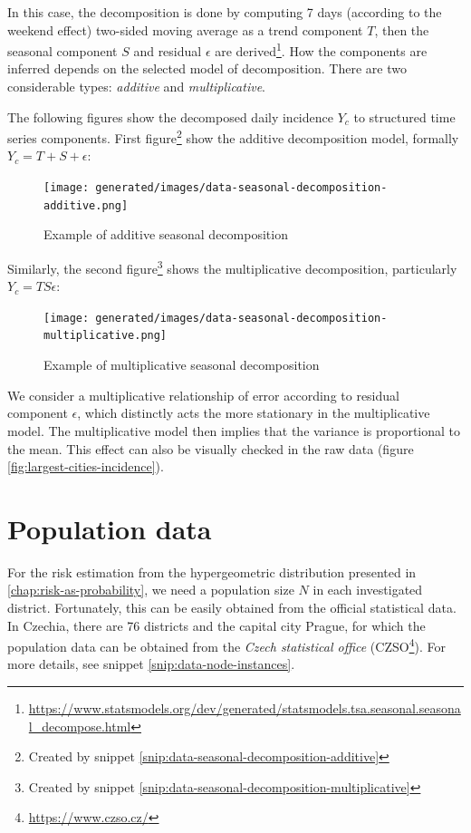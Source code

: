 \documentclass[
  digital, %
  oneside, %
  lof,     %
  lot,     %
]{fithesis4}
\begin{document}
In this case, the decomposition is done by computing 7 days (according to the weekend effect) two-sided moving average as a trend component $T$, then the seasonal component $S$ and residual $\epsilon$ are derived\footnote{\url{https://www.statsmodels.org/dev/generated/statsmodels.tsa.seasonal.seasonal_decompose.html}}. 
How the components are inferred depends on the selected model of decomposition. There are two considerable types: \textit{additive} and \textit{multiplicative}.

The following figures show the decomposed daily incidence $Y_c$ to structured time series components. 
First figure\footnote{Created by snippet \ref{snip:data-seasonal-decomposition-additive}} show the additive decomposition model, formally $Y_c = T + S + \epsilon$:

\begin{figure}[H]
  \begin{center}
    \texttt{[image: generated/images/data-seasonal-decomposition-additive.png]}
  \end{center}
  \caption{Example of additive seasonal decomposition}
  \label{fig:seasonal-decomposition-additive}
\end{figure}

Similarly, the second figure\footnote{Created by snippet \ref{snip:data-seasonal-decomposition-multiplicative}} shows the multiplicative decomposition, particularly $Y_c = T S \epsilon$:

\begin{figure}[H]
  \begin{center}
    \texttt{[image: generated/images/data-seasonal-decomposition-multiplicative.png]}
  \end{center}
  \caption{Example of multiplicative seasonal decomposition}
  \label{fig:seasonal-decomposition-multiplicative}
\end{figure}

We consider a multiplicative relationship of error according to residual component $\epsilon$, which distinctly acts the more stationary in the multiplicative model.
The multiplicative model then implies that the variance is proportional to the mean.
This effect can also be visually checked in the raw data (figure \ref{fig:largest-cities-incidence}).


\section{Population data}

For the risk estimation from the hypergeometric distribution presented in \autoref{chap:risk-as-probability}, we need a population size $N$ in each investigated district.
Fortunately, this can be easily obtained from the official statistical data.
In Czechia, there are 76 districts and the capital city Prague, for which the population data can be obtained from the \textit{Czech statistical office} (CZSO\footnote{\url{https://www.czso.cz/}}).
For more details, see snippet \ref{snip:data-node-instances}.
\end{document}

